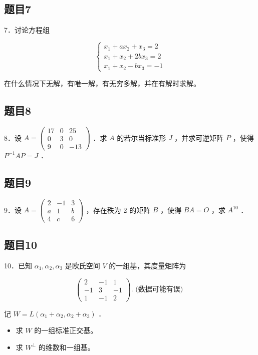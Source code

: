 \documentclass{article}
\begin{document}
\subsection{题目7}
7．讨论方程组

\[
\left\{\begin{array}{l}
x_{1}+a x_{2}+x_{3}=2 \\
x_{1}+x_{2}+2 b x_{3}=2 \\
x_{1}+x_{2}-b x_{3}=-1
\end{array}\right.
\]

在什么情况下无解，有唯一解，有无穷多解，并在有解时求解。

\subsection{题目8}
8．设 \(A=\left(\begin{array}{ccc}17 & 0 & 25 \\ 0 & 3 & 0 \\ 9 & 0 & -13\end{array}\right)\) ．求 \(A\) 的若尔当标准形 \(J\) ，并求可逆矩阵 \(P\) ，使得 \(P^{-1} A P=J\) ．

\subsection{题目9}
9．设 \(A=\left(\begin{array}{ccc}2 & -1 & 3 \\ a & 1 & b \\ 4 & c & 6\end{array}\right)\) ，存在秩为 2 的矩阵 \(B\) ，使得 \(B A=O\) ，求 \(A^{10}\) ．

\subsection{题目10}
10．已知 \(\alpha_{1}, \alpha_{2}, \alpha_{3}\) 是欧氏空间 \(V\) 的一组基，其度量矩阵为

\[
\left(\begin{array}{ccc}
2 & -1 & 1 \\
-1 & 3 & -1 \\
1 & -1 & 2
\end{array}\right) \text {. (数据可能有误) }
\]

记 \(W=L\left(\alpha_{1}+\alpha_{2}, \alpha_{2}+\alpha_{3}\right)\) ．

\begin{itemize}
  \item[（1）] 求 \(W\) 的一组标准正交基。
  \item[（2）] 求 \(W^{\perp}\) 的维数和一组基。
\end{itemize}
\end{document}
